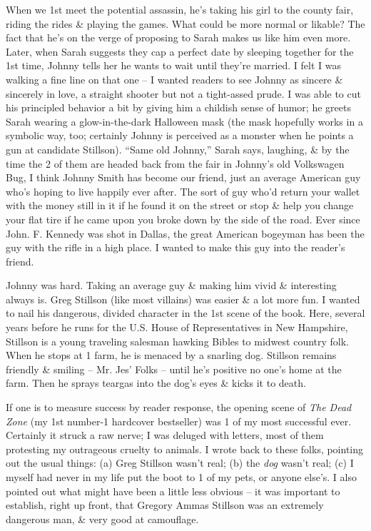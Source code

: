 \documentclass{article}
\numberwithin{equation}{section}
\begin{document}
When we 1st meet the potential assassin, he's taking his girl to the county fair, riding the rides \& playing the games. What could be more normal or likable? The fact that he's on the verge of proposing to Sarah makes us like him even more. Later, when Sarah suggests they cap a perfect date by sleeping together for the 1st time, Johnny tells her he wants to wait until they're married. I felt I was walking a fine line on that one -- I wanted readers to see Johnny as sincere \& sincerely in love, a straight shooter but not a tight-assed prude. I was able to cut his principled behavior a bit by giving him a childish sense of humor; he greets Sarah wearing a glow-in-the-dark Halloween mask (the mask hopefully works in a symbolic way, too; certainly Johnny is perceived as a monster when he points a gun at candidate Stillson). ``Same old Johnny,'' Sarah says, laughing, \& by the time the 2 of them are headed back from the fair in Johnny's old Volkswagen Bug, I think Johnny Smith has become our friend, just an average American guy who's hoping to live happily ever after. The sort of guy who'd return your wallet with the money still in it if he found it on the street or stop \& help you change your flat tire if he came upon you broke down by the side of the road. Ever since John. F. Kennedy was shot in Dallas, the great American bogeyman has been the guy with the rifle in a high place. I wanted to make this guy into the reader's friend.

Johnny was hard. Taking an average guy \& making him vivid \& interesting always is. Greg Stillson (like most villains) was easier \& a lot more fun. I wanted to nail his dangerous, divided character in the 1st scene of the book. Here, several years before he runs for the U.S. House of Representatives in New Hampshire, Stillson is a young traveling salesman hawking Bibles to midwest country folk. When he stops at 1 farm, he is menaced by a snarling dog. Stillson remains friendly \& smiling -- Mr. Jes' Folks -- until he's positive no one's home at the farm. Then he sprays teargas into the dog's eyes \& kicks it to death.

If one is to measure success by reader response, the opening scene of \textit{The Dead Zone} (my 1st number-1 hardcover bestseller) was 1 of my most successful ever. Certainly it struck a raw nerve; I was deluged with letters, most of them protesting my outrageous cruelty to animals. I wrote back to these folks, pointing out the usual things: (a) Greg Stillson wasn't real; (b) the \textit{dog} wasn't real; (c) I myself had never in my life put the boot to 1 of my pets, or anyone else's. I also pointed out what might have been a little less obvious -- it was important to establish, right up front, that Gregory Ammas Stillson was an extremely dangerous man, \& very good at camouflage.
\end{document}
